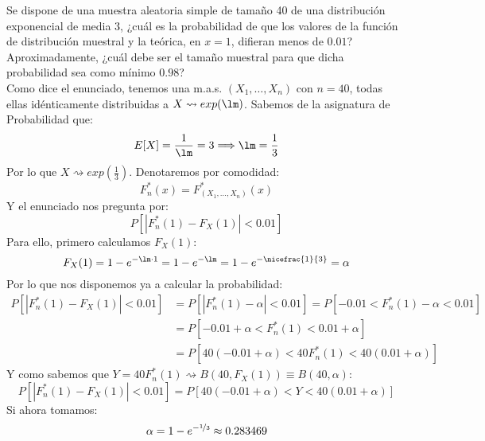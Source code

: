 \begin{ejercicio}
    Se dispone de una muestra aleatoria simple de tamaño 40 de una distribución exponencial de media 3, ¿cuál es la probabilidad de que los valores de la función de distribución muestral y la teórica, en $x=1$, difieran menos de $0.01$? Aproximadamente, ¿cuál debe ser el tamaño muestral para que dicha probabilidad sea como mínimo $0.98$?\\

    \noindent
    Como dice el enunciado, tenemos una m.a.s. $(X_1, \ldots, X_n)$ con $n=40$, todas ellas idénticamente distribuidas a $X\rightsquigarrow exp(\lm)$. Sabemos de la asignatura de Probabilidad que:
    \begin{equation*}
        E[X] = \dfrac{1}{\lm} = 3 \Longrightarrow \lm = \dfrac{1}{3}
    \end{equation*}
    Por lo que $X\rightsquigarrow exp\left(\frac{1}{3}\right)$. Denotaremos por comodidad:
    \begin{equation*}
        F_n^\ast(x) = F_{(X_1, \ldots, X_n)}^\ast(x) 
    \end{equation*}
    Y el enunciado nos pregunta por:
    \begin{equation*}
        P[|F_n^\ast(1) - F_X(1)| < 0.01]
    \end{equation*}
    Para ello, primero calculamos $F_X(1)$:
    \begin{equation*}
        F_X(1) = 1 - e^{-\lm\cdot  1} = 1-e^{-\lm} = 1-e^{-\nicefrac{1}{3}} = \alpha
    \end{equation*}
    Por lo que nos disponemos ya a calcular la probabilidad:
    \begin{align*}
        P[|F_n^\ast(1) - F_X(1)| < 0.01] &= P[|F_n^\ast(1) - \alpha| < 0.01] = P[-0.01 < F_n^\ast(1) - \alpha < 0.01] \\
                                         &= P[-0.01+\alpha < F_n^\ast(1) < 0.01+\alpha] \\
                                         &= P[40(-0.01+\alpha) < 40F_n^\ast(1) < 40(0.01+\alpha)]
    \end{align*}
    Y como sabemos que $Y = 40F_n^\ast(1) \rightsquigarrow B(40, F_X(1)) \equiv B(40, \alpha)$:
    \begin{equation*}
        P[|F_n^\ast(1) - F_X(1)| < 0.01] = P[40(-0.01+\alpha) < Y< 40(0.01+\alpha)] 
    \end{equation*}
    Si ahora tomamos:
    \begin{equation*}
        \alpha = 1-e^{-\nicefrac{1}{3}}\approx 0.283469

\end{equation*}
\end{ejercicio}
